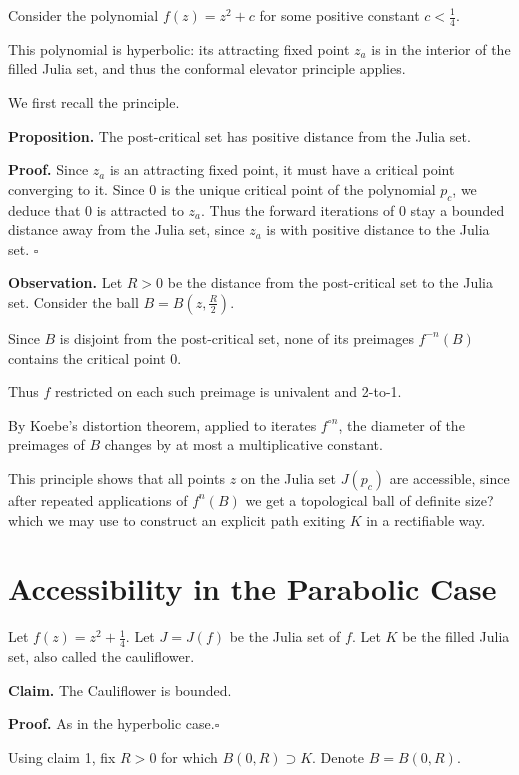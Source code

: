 \documentclass[hebrew,english]{article}
\begin{document}
Consider the polynomial $f(z)=z^{2}+c$ for some positive constant
$c<\frac{1}{4}$.

This polynomial is hyperbolic: its attracting fixed point $z_{a}$
is in the interior of the filled Julia set, and thus the conformal
elevator principle applies.

We first recall the principle.

\textbf{Proposition. }The post-critical set has positive distance
from the Julia set.

\textbf{Proof. }Since \textbf{$z_{a}$ }is an attracting fixed point,\textbf{
}it must have a critical point converging to it. Since $0$ is the
unique critical point of the polynomial $p_{c}$, we deduce that $0$
is attracted to $z_{a}$. Thus the forward iterations of $0$ stay
a bounded distance away from the Julia set, since $z_{a}$ is with
positive distance to the Julia set. $\square$

\textbf{Observation. }Let $R>0$ be the distance from the post-critical
set to the Julia set. Consider the ball $B=B(z,\frac{R}{2})$. 

Since $B$ is disjoint from the post-critical set, none of its preimages
$f^{-n}\left(B\right)$ contains the critical point $0$. 

Thus $f$ restricted on each such preimage is univalent and 2-to-1.

By Koebe's distortion theorem, applied to iterates $f^{\circ n}$,
the diameter of the preimages of $B$ changes by at most a multiplicative
constant.

This principle shows that all points $z$ on the Julia set $J(p_{c})$
are accessible, since after repeated applications of $f^{n}(B)$ we
get a topological ball of definite size? which we may use to construct
an explicit path exiting $K$ in a rectifiable way.

\section{Accessibility in the Parabolic Case}

Let $f(z)=z^{2}+\frac{1}{4}$. Let $J=J(f)$ be the Julia set of $f$.
Let $K$ be the filled Julia set, also called the cauliflower.

\textbf{Claim. }The Cauliflower is bounded.

\textbf{Proof. }As in the hyperbolic case.$\square$

Using claim 1, fix $R>0$ for which $B(0,R)\supset K$. Denote $B=B(0,R)$.
\end{document}
